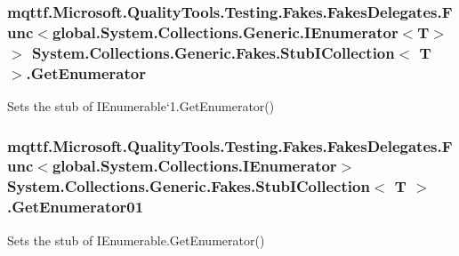 \hypertarget{class_system_1_1_collections_1_1_generic_1_1_fakes_1_1_stub_i_collection_3_01_t_01_4_a58735be7f0b7c79986fb1496d4a53ac2}{
\subsubsection[{Get\-Enumerator}]{\setlength{\rightskip}{0pt plus 5cm}mqttf.\-Microsoft.\-Quality\-Tools.\-Testing.\-Fakes.\-Fakes\-Delegates.\-Func$<$global.\-System.\-Collections.\-Generic.\-I\-Enumerator$<$T$>$ $>$ System.\-Collections.\-Generic.\-Fakes.\-Stub\-I\-Collection$<$ T $>$.Get\-Enumerator}}\label{class_system_1_1_collections_1_1_generic_1_1_fakes_1_1_stub_i_collection_3_01_t_01_4_a58735be7f0b7c79986fb1496d4a53ac2}


Sets the stub of I\-Enumerable`1.Get\-Enumerator()

\hypertarget{class_system_1_1_collections_1_1_generic_1_1_fakes_1_1_stub_i_collection_3_01_t_01_4_a008e99e3fc28589451ae5d7c52a2a405}{
\subsubsection[{Get\-Enumerator01}]{\setlength{\rightskip}{0pt plus 5cm}mqttf.\-Microsoft.\-Quality\-Tools.\-Testing.\-Fakes.\-Fakes\-Delegates.\-Func$<$global.\-System.\-Collections.\-I\-Enumerator$>$ System.\-Collections.\-Generic.\-Fakes.\-Stub\-I\-Collection$<$ T $>$.Get\-Enumerator01}}\label{class_system_1_1_collections_1_1_generic_1_1_fakes_1_1_stub_i_collection_3_01_t_01_4_a008e99e3fc28589451ae5d7c52a2a405}


Sets the stub of I\-Enumerable.\-Get\-Enumerator()


